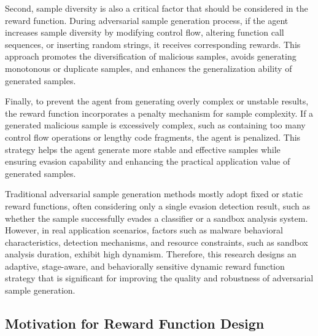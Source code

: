 Second, sample diversity is also a critical factor that should be considered in the reward function. During adversarial sample generation process, if the agent increases sample diversity by modifying control flow, altering function call sequences, or inserting random strings, it receives corresponding rewards. This approach promotes the diversification of malicious samples, avoids generating monotonous or duplicate samples, and enhances the generalization ability of generated samples.

Finally, to prevent the agent from generating overly complex or unstable results, the reward function incorporates a penalty mechanism for sample complexity. If a generated malicious sample is excessively complex, such as containing too many control flow operations or lengthy code fragments, the agent is penalized. This strategy helps the agent generate more stable and effective samples while ensuring evasion capability and enhancing the practical application value of generated samples.

Traditional adversarial sample generation methods mostly adopt fixed or static reward functions, often considering only a single evasion detection result, such as whether the sample successfully evades a classifier or a sandbox analysis system\cite{anderson2018learning}. However, in real application scenarios, factors such as malware behavioral characteristics, detection mechanisms, and resource constraints, such as sandbox analysis duration, exhibit high dynamism. Therefore, this research designs an adaptive, stage-aware, and behaviorally sensitive dynamic reward function strategy that is significant for improving the quality and robustness of adversarial sample generation.

\subsection{Motivation for Reward Function Design}


